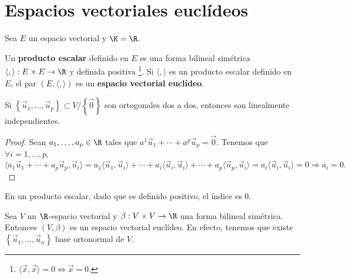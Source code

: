 \chapter{Espacios vectoriales euclídeos}
Sea $\displaystyle E $ un espacio vectorial y $\displaystyle \K = \R $.
\begin{fdefinition}
\normalfont Un \textbf{producto escalar} definido en $\displaystyle E $ es una forma bilineal simétrica $\displaystyle \langle , \rangle : E \times E \to \R $ y definida positiva \footnote{$\displaystyle \langle \vec{x},\vec{x} \rangle = 0 \iff \vec{x} = 0 $.}. Si $\displaystyle \langle,\rangle  $ es un producto escalar definido en $\displaystyle E $, el par $\displaystyle \left(E, \langle,\rangle \right) $ es un \textbf{espacio vectorial euclídeo}.
\end{fdefinition}
\begin{fprop}[]
	\normalfont Si $\displaystyle \left\{ \vec{u}_{1}, \ldots, \vec{u}_{p}\right\} \subset V/ \left\{ \vec{0}\right\}  $ son ortogonales dos a dos, entonces son linealmente independientes.
\end{fprop}
\begin{proof}
Sean $\displaystyle a_{1}, \ldots, a_{p} \in \R $ tales que $\displaystyle a^{1}\vec{u}_{1} + \cdots + a^{p}\vec{u}_{p} = \vec{0} $.
Tenemos que $\displaystyle \forall i = 1, \ldots, p $, 
\[ \langle a_{1}\vec{u}_{1} + \cdots + a_{p}\vec{u}_{p}, \vec{u}_{i}\rangle = a_{1}\langle \vec{u}_{1}, \vec{u}_{i}\rangle + \cdots + a_{i}\langle \vec{u}_{i}, \vec{u}_{i}\rangle + \cdots + a_{p}\langle \vec{u}_{p}, \vec{u}_{i}\rangle = a_{i}\langle \vec{u}_{i}, \vec{u}_{i}\rangle = 0 \Rightarrow a_{i} = 0 .\]
\end{proof}
\begin{observation}
\normalfont En un producto escalar, dado que es definido positivo, el índice es 0.
\end{observation}
Sea $\displaystyle V $ un $\displaystyle \R $-espacio vectorial y $\displaystyle \beta : V \times V \to \R $ una forma bilineal simétrica. Entonces $\displaystyle \left(V,\beta \right) $ es un espacio vectorial euclídeo. En efecto, tenemos que existe $\displaystyle \left\{ \vec{u}_{1}, \ldots, \vec{u}_{n}\right\}  $ base ortonormal de $\displaystyle V $.
